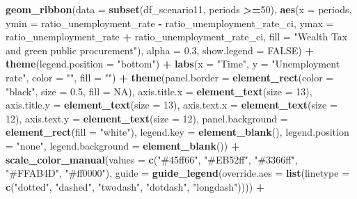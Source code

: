 \documentclass[
]{article}
\newenvironment{Shaded}{\begin{snugshade}}{\end{snugshade}}
\newcommand{\AttributeTok}[1]{\textcolor[rgb]{0.13,0.29,0.53}{#1}}
\newcommand{\ConstantTok}[1]{\textcolor[rgb]{0.56,0.35,0.01}{#1}}
\newcommand{\DecValTok}[1]{\textcolor[rgb]{0.00,0.00,0.81}{#1}}
\newcommand{\FloatTok}[1]{\textcolor[rgb]{0.00,0.00,0.81}{#1}}
\newcommand{\FunctionTok}[1]{\textcolor[rgb]{0.13,0.29,0.53}{\textbf{#1}}}
\newcommand{\NormalTok}[1]{#1}
\newcommand{\SpecialCharTok}[1]{\textcolor[rgb]{0.81,0.36,0.00}{\textbf{#1}}}
\newcommand{\StringTok}[1]{\textcolor[rgb]{0.31,0.60,0.02}{#1}}
\begin{document}
\begin{Shaded}
\begin{Highlighting}[]
  \FunctionTok{geom\_ribbon}\NormalTok{(}\AttributeTok{data =} \FunctionTok{subset}\NormalTok{(df\_scenario11, periods }\SpecialCharTok{\textgreater{}=}\DecValTok{50}\NormalTok{), }\FunctionTok{aes}\NormalTok{(}\AttributeTok{x =}\NormalTok{ periods, }\AttributeTok{ymin =}\NormalTok{ ratio\_unemployment\_rate }\SpecialCharTok{{-}}\NormalTok{ ratio\_unemployment\_rate\_ci, }\AttributeTok{ymax =}\NormalTok{ ratio\_unemployment\_rate }\SpecialCharTok{+}\NormalTok{ ratio\_unemployment\_rate\_ci, }\AttributeTok{fill =} \StringTok{"Wealth Tax and green public procurement"}\NormalTok{), }\AttributeTok{alpha =} \FloatTok{0.3}\NormalTok{, }\AttributeTok{show.legend =} \ConstantTok{FALSE}\NormalTok{) }\SpecialCharTok{+}
  \FunctionTok{theme}\NormalTok{(}\AttributeTok{legend.position =} \StringTok{"bottom"}\NormalTok{) }\SpecialCharTok{+}
  \FunctionTok{labs}\NormalTok{(}\AttributeTok{x =} \StringTok{"Time"}\NormalTok{, }\AttributeTok{y =} \StringTok{"Unemployment rate"}\NormalTok{, }\AttributeTok{color =} \StringTok{""}\NormalTok{, }\AttributeTok{fill =} \StringTok{""}\NormalTok{) }\SpecialCharTok{+}
  \FunctionTok{theme}\NormalTok{(}\AttributeTok{panel.border =} \FunctionTok{element\_rect}\NormalTok{(}\AttributeTok{color =} \StringTok{"black"}\NormalTok{, }\AttributeTok{size =} \FloatTok{0.5}\NormalTok{, }\AttributeTok{fill =} \ConstantTok{NA}\NormalTok{),}
        \AttributeTok{axis.title.x =} \FunctionTok{element\_text}\NormalTok{(}\AttributeTok{size =} \DecValTok{13}\NormalTok{),}
        \AttributeTok{axis.title.y =} \FunctionTok{element\_text}\NormalTok{(}\AttributeTok{size =} \DecValTok{13}\NormalTok{),}
        \AttributeTok{axis.text.x =} \FunctionTok{element\_text}\NormalTok{(}\AttributeTok{size =} \DecValTok{12}\NormalTok{),}
        \AttributeTok{axis.text.y =} \FunctionTok{element\_text}\NormalTok{(}\AttributeTok{size =} \DecValTok{12}\NormalTok{),}
        \AttributeTok{panel.background =} \FunctionTok{element\_rect}\NormalTok{(}\AttributeTok{fill =} \StringTok{"white"}\NormalTok{),}
        \AttributeTok{legend.key =} \FunctionTok{element\_blank}\NormalTok{(),}
         \AttributeTok{legend.position =} \StringTok{"none"}\NormalTok{,}
        \AttributeTok{legend.background =} \FunctionTok{element\_blank}\NormalTok{()) }\SpecialCharTok{+}
  \FunctionTok{scale\_color\_manual}\NormalTok{(}\AttributeTok{values =} \FunctionTok{c}\NormalTok{(}\StringTok{"\#45ff66"}\NormalTok{, }\StringTok{"\#EB52ff"}\NormalTok{, }\StringTok{"\#3366ff"}\NormalTok{, }\StringTok{"\#FFAB4D"}\NormalTok{, }\StringTok{"\#ff0000"}\NormalTok{),}
                     \AttributeTok{guide =} \FunctionTok{guide\_legend}\NormalTok{(}\AttributeTok{override.aes =} \FunctionTok{list}\NormalTok{(}\AttributeTok{linetype =} \FunctionTok{c}\NormalTok{(}\StringTok{"dotted"}\NormalTok{, }\StringTok{"dashed"}\NormalTok{, }\StringTok{"twodash"}\NormalTok{, }\StringTok{"dotdash"}\NormalTok{, }\StringTok{"longdash"}\NormalTok{)))) }\SpecialCharTok{+}

\end{Highlighting}
\end{Shaded}
\end{document}
